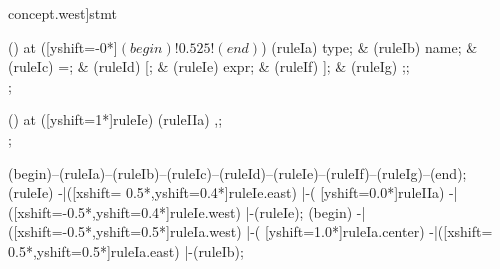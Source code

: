 \begin{syntax}[[xshift=24mm]concept.west]{stmt}
  
  \node[sequence,column sep=1.0cm] () at ([yshift=-0*\syntaxruledist]$(begin)!0.525!(end)$) {
    \node[nonterminal]    (ruleIa) {type};
    &
    \node[terminal]       (ruleIb) {name};
    &
    \node[terminal]       (ruleIc) {=};
    &
    \node[terminal]       (ruleId) {[};
    &
    \node[nonterminal]    (ruleIe) {expr};
    &
    \node[terminal]       (ruleIf) {]};
    &
    \node[terminal]       (ruleIg) {;};
    \\
  };
  
  \node[sequence] () at ([yshift=1*\syntaxruledist]ruleIe) {
    \node[terminal]    (ruleIIa) {,};
    \\
  };
  
  \draw[path] (begin)--(ruleIa)--(ruleIb)--(ruleIc)--(ruleId)--(ruleIe)--(ruleIf)--(ruleIg)--(end);
  \draw[path] (ruleIe)
            -|([xshift= 0.5*\syntaxruledist,yshift=0.4*\syntaxruledist]ruleIe.east)
            |-(                            [yshift=0.0*\syntaxruledist]ruleIIa)
            -|([xshift=-0.5*\syntaxruledist,yshift=0.4*\syntaxruledist]ruleIe.west)
            |-(ruleIe);
  \draw[path] (begin)
            -|([xshift=-0.5*\syntaxruledist,yshift=0.5*\syntaxruledist]ruleIa.west)
            |-(                            [yshift=1.0*\syntaxruledist]ruleIa.center)
            -|([xshift= 0.5*\syntaxruledist,yshift=0.5*\syntaxruledist]ruleIa.east)
            |-(ruleIb);
\end{syntax}

